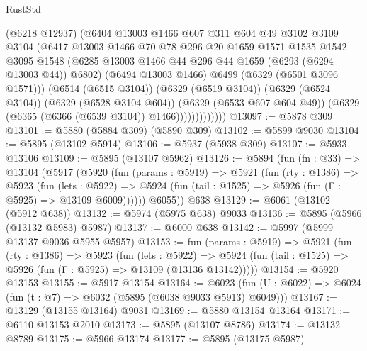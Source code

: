 \begin{lexlean}{RustStd}
\begin{coremodule}
{{                        (@6218 @12937)
                        (@6404
                          @13003
                          @1466
                          @607
                          @311
                          @604
                          @49
                          @3102
                          @3109
                          @3104
                          (@6417
                            @13003
                            @1466
                            @70
                            @78
                            @296
                            @20
                            @1659
                            @1571
                            @1535
                            @1542
                            @3095
                            @1548
                            (@6285 @13003 @1466 @44 @296 @44 @1659 (@6293 (@6294 @13003 @44)) @6802)
                            (@6494 @13003 @1466)
                            @6499
                            (@6329 (@6501 @3096 @1571)))
                          (@6514 (@6515 @3104))
                          (@6329 (@6519 @3104))
                          (@6329 (@6524 @3104))
                          (@6329 (@6528 @3104 @604))
                          (@6329 (@6533 @607 @604 @49))
                          (@6329 (@6365 (@6366 (@6539 @3104)) @1466)))))))))))))
@13097 := @5878 @309
@13101 := @5880 (@5884 @309) (@5890 @309)
@13102 := @5899 @9030
@13104 := @5895 (@13102 @5914)
@13106 := @5937 (@5938 @309)
@13107 := @5933 @13106
@13109 := @5895 (@13107 @5962)
@13126 := @5894
    (fun (fn : @33) =>
    @13104
      (@5917
        (@5920
          (fun (params : @5919) =>
          @5921
            (fun (rty : @1386) =>
            @5923
              (fun (lets : @5922) =>
              @5924 (fun (tail : @1525) => @5926 (fun (Γ : @5925) => @13109 @6009))))))
        @6055))
    @638
@13129 := @6061 (@13102 (@5912 @638))
@13132 := @5974 (@5975 @638) @9033
@13136 := @5895 (@5966 (@13132 @5983) @5987)
@13137 := @6000 @638
@13142 := @5997 (@5999 @13137 @9036 @5955 @5957)
@13153 := fun (params : @5919) =>
  @5921
    (fun (rty : @1386) =>
    @5923
      (fun (lets : @5922) =>
      @5924 (fun (tail : @1525) => @5926 (fun (Γ : @5925) => @13109 (@13136 @13142)))))
@13154 := @5920 @13153
@13155 := @5917 @13154
@13164 := @6023 (fun (U : @6022) => @6024 (fun (t : @7) => @6032 (@5895 (@6038 @9033 @5913) @6049)))
@13167 := @13129 (@13155 @13164) @9031
@13169 := @5880 @13154 @13164
@13171 := @6110 @13153 @2010
@13173 := @5895 (@13107 @8786)
@13174 := @13132 @8789
@13175 := @5966 @13174
@13177 := @5895 (@13175 @5987)
}}
\end{coremodule}
\end{lexlean}
